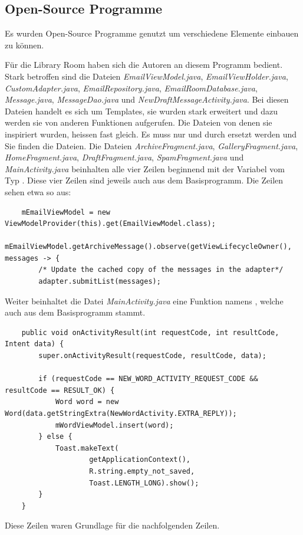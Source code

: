 \documentclass[a4paper,11pt]{article}
\begin{document}
\newpage
\begin{appendices}
\subsection*{Open-Source Programme}
Es wurden Open-Source Programme genutzt um verschiedene Elemente einbauen zu können. 

Für die Library Room haben sich die Autoren an diesem Programm bedient. \cite{roomApp}
Stark betroffen sind die Dateien \textit{EmailViewModel.java}, \textit{EmailViewHolder.java}, \textit{CustomAdapter.java}, \textit{EmailRepository.java}, \textit{EmailRoomDatabase.java}, \textit{Message.java}, \textit{MessageDao.java}
und \textit{NewDraftMessageActivity.java}. Bei diesen
Dateien handelt es sich um Templates, sie wurden stark erweitert und dazu werden sie von anderen Funktionen aufgerufen. 
Die Dateien von denen sie inspiriert wurden, heissen fast gleich. Es muss nur  und  durch  ersetzt werden und Sie finden die Dateien.
Die Dateien \textit{ArchiveFragment.java}, \textit{GalleryFragment.java}, \textit{HomeFragment.java}, \textit{DraftFragment.java}, \textit{SpamFragment.java} und \textit{MainActivity.java} beinhalten alle vier Zeilen beginnend mit der 
Variabel  vom Typ . Diese vier Zeilen sind jeweils auch aus dem Basisprogramm. 
Die Zeilen sehen etwa so aus:
\lstset{language=java}
\begin{lstlisting}
    mEmailViewModel = new ViewModelProvider(this).get(EmailViewModel.class);
    mEmailViewModel.getArchiveMessage().observe(getViewLifecycleOwner(), messages -> {
        /* Update the cached copy of the messages in the adapter*/
        adapter.submitList(messages);

\end{lstlisting}


Weiter beinhaltet die Datei \textit{MainActivity.java} eine Funktion namens , welche auch aus dem Basisprogramm stammt. 
    \lstset{language=java}
    \begin{lstlisting}
    public void onActivityResult(int requestCode, int resultCode, Intent data) {
        super.onActivityResult(requestCode, resultCode, data);

        if (requestCode == NEW_WORD_ACTIVITY_REQUEST_CODE && resultCode == RESULT_OK) {
            Word word = new Word(data.getStringExtra(NewWordActivity.EXTRA_REPLY));
            mWordViewModel.insert(word);
        } else {
            Toast.makeText(
                    getApplicationContext(),
                    R.string.empty_not_saved,
                    Toast.LENGTH_LONG).show();
        }
    }
    \end{lstlisting}
Diese Zeilen waren Grundlage für die nachfolgenden Zeilen.


\end{appendices}
\end{document}
